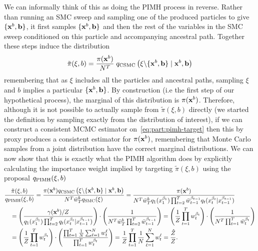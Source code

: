 We can informally think of this as doing the PIMH process in reverse.  Rather than
running an SMC sweep and sampling one of the produced particles to give $\{\mathbf{x}^{b},\mathbf{b}\}$, it
first samples $\{\mathbf{x}^{b},\mathbf{b}\}$ and then the rest of the variables in the SMC sweep conditioned
on this particle and accompanying ancestral path.
Together these steps induce the distribution
\begin{align}
\label{eq:part:pimh-target}
\tilde{\pi}(\xi,b) = \frac{\pi(\mathbf{x}^{b})}{N^T} \; q_{\text{CSMC}}\left(\mathbf{\xi} \backslash \{\mathbf{x}^b, \mathbf{b}\} \mid \mathbf{x}^b, \mathbf{b} \right)
\end{align}
remembering that as $\xi$ includes all the particles and ancestral paths, sampling $\xi$
and $b$ implies a particular $\{\mathbf{x}^{b},\mathbf{b}\}$.
By construction (i.e the first step of our hypothetical process), the marginal of this distribution is $\pi(\mathbf{x}^{b})$.
Therefore, although it is not possible to actually
sample from $\tilde{\pi}(\xi,b)$ directly (we started the definition by sampling exactly
from the distribution of interest), if we can
construct a consistent MCMC estimator on~\eqref{eq:part:pimh-target} then this by proxy
produces a consistent estimator for $\pi(\mathbf{x}^{b})$, remembering that Monte Carlo samples
from a joint distribution have the correct marginal distributions.
We can now show that this is exactly what the
PIMH algorithm does by explicitly calculating the importance weight implied by
targeting $\tilde{\pi}(\xi,b)$ using the proposal $q_{\text{PIMH}}(\mathbf{\xi},b)$
\begin{align}
&\frac{\tilde{\pi}(\xi,b)}{q_{\text{PIMH}}(\mathbf{\xi},b)} = \frac{\pi(\mathbf{x}^{b}) q_{\text{CSMC}}\left(\mathbf{\xi} \backslash \{\mathbf{x}^b, \mathbf{b}\} \mid \mathbf{x}^b, \mathbf{b} \right)}
{N^T \bar{w}_T^b q_{\text{SMC}}(\mathbf{\xi})} = \frac{\pi(\mathbf{x}^{b})}{N^T \bar{w}_T^b q_1(x_1^{\beta_1}) \prod_{t=2}^{T} \bar{w}_{t-1}^{\beta_{t-1}} q_t(x_t^{\beta_t} | x_{t-1}^{\beta_{t-1}})} \nonumber \\
&\quad = \left(\frac{\gamma(\mathbf{x}^{b})/Z}{
	q_1(x_1^{\beta_1}) \prod_{t=2}^{T} q_t(x_t^{\beta_t} | x_{t-1}^{\beta_{t-1}})}\right) \cdot
	\left( \frac{1}{N^T \bar{w}_T^b\prod_{t=2}^{T} \bar{w}_{t-1}^{\beta_{t-1}}} \right) 
	= \left(\frac{1}{Z}
	 \prod_{t=1}^{T} w_{t}^{\beta_{t}}\right)\cdot\left(
	\frac{1}{N^T \prod_{t=1}^{T} \bar{w}_{t}^{\beta_{t}}}\right) \nonumber \\
&\quad = \left(\frac{1}{Z}
\prod_{t=1}^{T} w_{t}^{\beta_{t}}\right)\cdot\left(
	\frac{\prod_{t=1}^T \frac{1}{N} \sum_{\ell=1}^N w_{t}^{\ell}}{\prod_{t=1}^{T} w_{t}^{\beta_{t}}}\right) 
	= \frac{1}{Z} \prod_{t=1}^T \frac{1}{N} \sum_{\ell=1}^N w_{t}^{\ell}
= \frac{\hat{Z}}{Z}. \label{eq:part:pimh-w}
\end{align}
